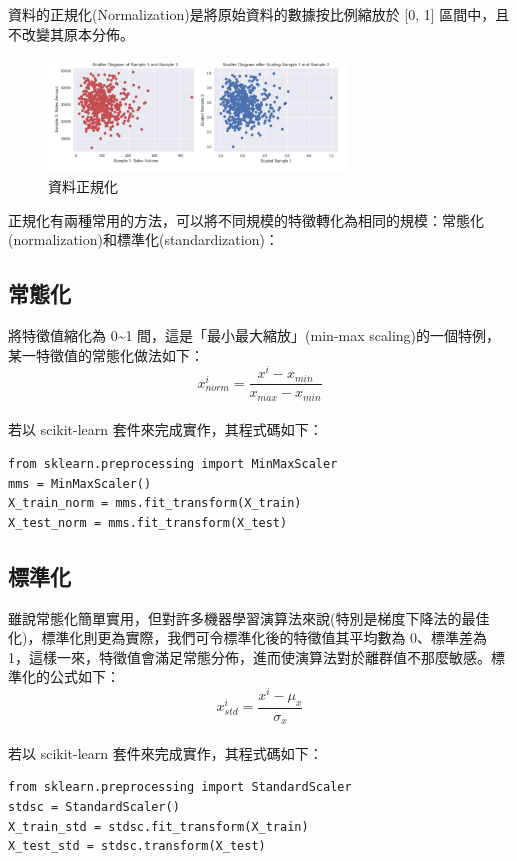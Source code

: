 \documentclass[a4paper,12pt]{article}
\begin{document}
資料的正規化(Normalization)是將原始資料的數據按比例縮放於 [0, 1] 區間中，且不改變其原本分佈。\\
\begin{figure}[htbp]
\centering
\includegraphics[width=300]{images/normalized.png}
\caption{\label{fig:Name}資料正規化}
\end{figure}

正規化有兩種常用的方法，可以將不同規模的特徵轉化為相同的規模：常態化(normalization)和標準化(standardization)：\\
\subsection{常態化}
\label{sec:orgd3576d9}

將特徵值縮化為 0\textasciitilde{}1 間，這是「最小最大縮放」(min-max scaling)的一個特例，某一特徵值的常態化做法如下：\\
$$x_{norm}^i = \frac{x^i-x_{min}}{x_{max}-x_{min}}$$\\
若以 scikit-learn 套件來完成實作，其程式碼如下：\\
\lstset{breaklines=true,language=shell,label= ,caption= ,captionpos=b,numbers=none}
\begin{lstlisting}
from sklearn.preprocessing import MinMaxScaler
mms = MinMaxScaler()
X_train_norm = mms.fit_transform(X_train)
X_test_norm = mms.fit_transform(X_test)
\end{lstlisting}

\subsection{標準化}
\label{sec:org0036f3c}

雖說常態化簡單實用，但對許多機器學習演算法來說(特別是梯度下降法的最佳化)，標準化則更為實際，我們可令標準化後的特徵值其平均數為 0、標準差為 1，這樣一來，特徵值會滿足常態分佈，進而使演算法對於離群值不那麼敏感。標準化的公式如下：\\
$$x_{std}^i = \frac{x^i-\mu_x}{\sigma_x}$$\\
若以 scikit-learn 套件來完成實作，其程式碼如下：\\
\lstset{breaklines=true,language=Python,label= ,caption= ,captionpos=b,numbers=none}
\begin{lstlisting}
from sklearn.preprocessing import StandardScaler
stdsc = StandardScaler()
X_train_std = stdsc.fit_transform(X_train)
X_test_std = stdsc.transform(X_test)
\end{lstlisting}
\end{document}
